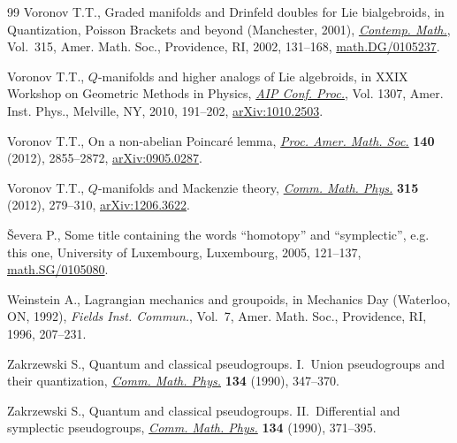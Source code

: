 \documentclass[10pt,a4paper]{amsart}
\numberwithin{equation}{section}
\theoremstyle{definition}
\begin{document}
\begin{thebibliography}{99}
Voronov T.T., Graded manifolds and {D}rinfeld doubles for {L}ie bialgebroids,
 in Quantization, {P}oisson Brackets and beyond ({M}anchester, 2001),
 \href{https://doi.org/10.1090/conm/315/05478}{\textit{Contemp. Math.}}, Vol.~315, Amer. Math. Soc., Providence, RI, 2002,
 131--168, \href{https://arxiv.org/abs/math.DG/0105237}{math.DG/0105237}.

Voronov T.T., {$Q$}-manifolds and higher analogs of {L}ie algebroids, in X{XIX}
 {W}orkshop on {G}eometric {M}ethods in {P}hysics, \href{https://doi.org/10.1063/1.3527417}{\textit{AIP Conf. Proc.}},
 Vol. 1307, Amer. Inst. Phys., Melville, NY, 2010, 191--202,
 \href{https://arxiv.org/abs/1010.2503}{arXiv:1010.2503}.

Voronov T.T., On a non-abelian {P}oincar\'{e} lemma, \href{https://doi.org/10.1090/S0002-9939-2011-11116-X}{\textit{Proc. Amer. Math.
 Soc.}} \textbf{140} (2012), 2855--2872, \href{https://arxiv.org/abs/0905.0287}{arXiv:0905.0287}.

Voronov T.T., {$Q$}-manifolds and {M}ackenzie theory, \href{https://doi.org/10.1007/s00220-012-1568-y}{\textit{Comm. Math.
 Phys.}} \textbf{315} (2012), 279--310, \href{https://arxiv.org/abs/1206.3622}{arXiv:1206.3622}.

\v{S}evera P., Some title containing the words ``homotopy'' and ``symplectic'',
 e.g. this one, University of Luxembourg, Luxembourg, 2005, 121--137,
 \href{https://arxiv.org/abs/math.SG/0105080}{math.SG/0105080}.

Weinstein A., Lagrangian mechanics and groupoids, in Mechanics Day ({W}aterloo,
 {ON}, 1992), \textit{Fields Inst. Commun.}, Vol.~7, Amer. Math. Soc.,
 Providence, RI, 1996, 207--231.

Zakrzewski S., Quantum and classical pseudogroups. {I}.~{U}nion pseudogroups
 and their quantization, \href{https://doi.org/10.1007/BF02097706}{\textit{Comm. Math. Phys.}} \textbf{134} (1990),
 347--370.

Zakrzewski S., Quantum and classical pseudogroups. {II}.~{D}ifferential and
 symplectic pseudogroups, \href{https://doi.org/10.1007/BF02097707}{\textit{Comm. Math. Phys.}} \textbf{134} (1990),
 371--395.

\end{thebibliography}
\end{document}
